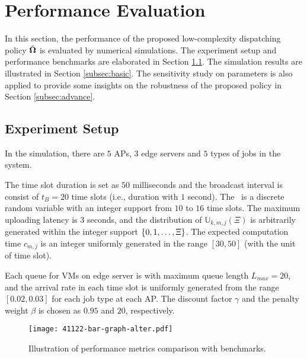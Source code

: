 \section{Performance Evaluation}
\label{sec:evaluation}
In this section, the performance of the proposed low-complexity dispatching policy $\tilde{\boldsymbol{\Omega}}$ is evaluated by numerical simulations.
The experiment setup and performance benchmarks are elaborated in Section \ref{subsec:setup}.
The simulation results are illustrated in Section \ref{subsec:basic}.
The sensitivity study on parameters is also applied to provide some insights on the robustness of the proposed policy in Section \ref{subsec:advance}.

\subsection{Experiment Setup}
\label{subsec:setup}
In the simulation, there are $5$ APs, $3$ edge servers and $5$ types of jobs in the system.

The time slot duration is set as $50$ milliseconds and the broadcast interval is consist of $t_{B}=20$ time slots (i.e., duration with $1$ second).
The \brlatency~is a discrete random variable with an integer support from $10$ to $16$ time slots.
The maximum uploading latency is $3$ seconds, and the distribution of $\mathbb{U}_{k,m,j}(\Xi)$  is arbitrarily generated within the integer support $\{0, 1, \dots, \Xi\}$.
The expected computation time $c_{m,j}$ is an integer uniformly generated in the range $[30,50]$ (with the unit of time slot).

Each queue for VMs on edge server is with maximum queue length $L_{max}=20$, and the arrival rate in each time slot is uniformly generated from the range $[0.02, 0.03]$ for each job type at each AP.
The discount factor $\gamma$ and the penalty weight $\beta$ is chosen as $0.95$ and $20$, respectively.

\begin{figure}[ht]                                                      %
    \centering                                                          %
    \texttt{[image: 41122-bar-graph-alter.pdf]}   %
    \caption{Illustration of performance metrics comparison with benchmarks.}
    \label{fig:bar_plot}                                                %
\end{figure}                                                            %

